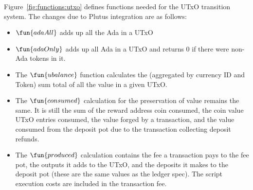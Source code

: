 Figure~\ref{fig:functions:utxo} defines functions needed for the UTxO transition system.
The changes due to Plutus integration are as follows:

\begin{itemize}
  \item $\fun{adaAll}$ adds up all the Ada in a UTxO

  \item $\fun{adaOnly}$ adds up all Ada in a UTxO and returns 0 if there were
  non-Ada tokens in it.

  \item
    The $\fun{ubalance}$ function calculates the (aggregated by currency ID and
    Token) sum total of all the value in a given UTxO.

  \item The $\fun{consumed}$ calculation for the preservation of value remains the
  same. It is still the sum of the reward address coin consumed, the coin value
   UTxO entries consumed, the value forged by a transaction,
   and the value consumed from the deposit pot due
   to the transaction collecting deposit refunds.

  \item The $\fun{produced}$ calculation contains the fee a transaction pays
  to the fee pot, the outputs it adds to the UTxO, and the deposits it makes
  to the deposit pot (these are the same values as the ledger spec).
  The script execution costs are included in the transaction fee.
\end{itemize}


